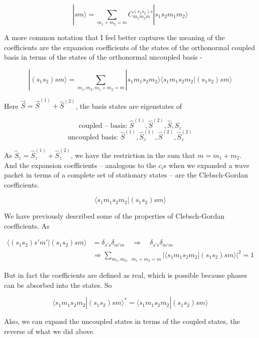 \[
  |sm\rangle = \sum_{m_1+m_2=m}^{} C_{m_1m_2m}^{(s_1s_2)s} |s_1s_2m_1m_2\rangle
\] \vspace{3px}

A more common notation that I feel better captures the meaning of the
coefficients are the expansion coefficients of the states of the orthonormal
coupled basis in terms of the states of the orthonormal uncoupled basis - 

\[
  |(s_1 s_2 ) sm \rangle = \sum_{m_1, m_2, m_1 + m_2 = m} |s_1m_1s_2m_2\rangle
  \langle s_1m_1s_2m_2|(s_1s_2)sm\rangle
\] \vspace{3px}

Here $\vec{S} = \vec{S}^{(1)} + \hat{S}^{(2)}$, the basis states are
eigenstates of 

\[ \text{coupled -- basis: } \hat{S}^{(1)}, \hat{S}^{(2)}, \hat{S}, \hat{S}_z
\] 
\[
  \text{uncoupled basis: } \hat{S}^{(1)}, \hat{S}_z^{(1)}, \hat{S}^{(2)},
  \hat{S}_z^{(2)}
\] \vspace{3px}

As $\hat{S}_z = \hat{S}_z^{(1)} + \hat{S}_z^{(2)}$, we have the restriction in
the sum that $m = m_1 + m_2$. And the expansion coefficients -- analogous to
the $c_i$s when we expanded a wave packet in terms of a complete set of
stationary states -- are the Clebsch-Gordan coefficients. 

\[
\langle s_1m_1 s_2 m_2 | (s_1 s_2) sm \rangle
\] \vspace{3px}

We have previously described some of the properties of Clebsch-Gordan
coefficients. As 

\begin{align} \label{}
  \langle (s_1 s_2 ) s' m' | (s_1 s_2) sm \rangle &= \delta_{s's} \delta_{m'm}
  \quad \Rightarrow \quad \delta_{s's}\delta_{m'm}\\ &\Rightarrow
  \sum_{m_1,m_2, \;\; m_1+m_2
  = m}^{} |\langle s_1 m_1 s_2 m_2 | (s_1 s_2) sm \rangle |^2 = 1
\end{align}\vspace{3px}


But in fact the coefficients are defined as real, which is possible because
phases can be absorbed into the states. So 

\[
\langle s_1 m_1 s_2 m_2 | (s_1 s_2) sm \rangle^* = \langle s_1 m_1 s_2 m_2
| (s_1s_2) sm\rangle
\] \vspace{3px}

Also, we can expand the uncoupled states in terms of the coupled states, the
reverse of what we did above. 

